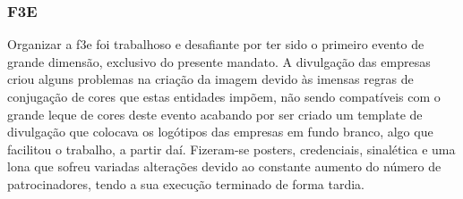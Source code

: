 
\subsubsection{F3E}

Organizar a \acrshort{f3e} foi trabalhoso e desafiante por ter sido o primeiro evento de grande dimensão, exclusivo do presente mandato. A divulgação das empresas criou alguns problemas na criação da imagem devido às imensas regras de conjugação de cores que estas entidades impõem, não sendo compatíveis com o grande leque de cores deste evento acabando por ser criado um template de divulgação que colocava os logótipos das empresas em fundo branco, algo que facilitou o trabalho, a partir daí. Fizeram-se posters, credenciais, sinalética e uma lona que sofreu variadas alterações devido ao constante aumento do número de patrocinadores, tendo a sua execução terminado de forma tardia.